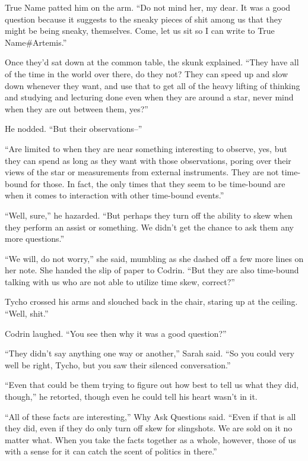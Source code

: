 True Name patted him on the arm. ``Do not mind her, my dear. It was a good question because it suggests to the sneaky pieces of shit among us that they might be being sneaky, themselves. Come, let us sit so I can write to True Name\#Artemis.''

Once they'd sat down at the common table, the skunk explained. ``They have all of the time in the world over there, do they not? They can speed up and slow down whenever they want, and use that to get all of the heavy lifting of thinking and studying and lecturing done even when they are around a star, never mind when they are out between them, yes?''

He nodded. ``But their observations--''

``Are limited to when they are near something interesting to observe, yes, but they can spend as long as they want with those observations, poring over their views of the star or measurements from external instruments. They are not time-bound for those. In fact, the only times that they seem to be time-bound are when it comes to interaction with other time-bound events.''

``Well, sure,'' he hazarded. ``But perhaps they turn off the ability to skew when they perform an assist or something. We didn't get the chance to ask them any more questions.''

``We will, do not worry,'' she said, mumbling as she dashed off a few more lines on her note. She handed the slip of paper to Codrin. ``But they are also time-bound talking with us who are not able to utilize time skew, correct?''

Tycho crossed his arms and slouched back in the chair, staring up at the ceiling. ``Well, shit.''

Codrin laughed. ``You see then why it was a good question?''

``They didn't say anything one way or another,'' Sarah said. ``So you could very well be right, Tycho, but you saw their silenced conversation.''

``Even that could be them trying to figure out how best to tell us what they did, though,'' he retorted, though even he could tell his heart wasn't in it.

``All of these facts are interesting,'' Why Ask Questions said. ``Even if that is all they did, even if they do only turn off skew for slingshots. We are sold on it no matter what. When you take the facts together as a whole, however, those of us with a sense for it can catch the scent of politics in there.''

